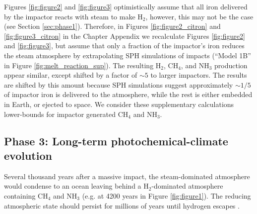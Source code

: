 Figures \ref{fig:figure2} and \ref{fig:figure3} optimistically assume that all iron delivered by the impactor reacts with steam to make H$_2$, however, this may not be the case (see Section \ref{sec:phase1}). Therefore, in Figures \ref{fig:figure2_citron} and \ref{fig:figure3_citron} in the Chapter Appendix we recalculate Figures \ref{fig:figure2} and \ref{fig:figure3}, but assume that only a fraction of the impactor's iron reduces the steam atmosphere by extrapolating SPH simulations of impacts (``Model 1B'' in Figure \ref{fig:melt_reaction_sup}). The resulting H$_2$, CH$_4$, and NH$_3$ production appear similar, except shifted by a factor of $\sim 5$ to larger impactors. The results are shifted by this amount because SPH simulations suggest approximately $\sim 1/5$ of impactor iron is delivered to the atmosphere, while the rest is either embedded in Earth, or ejected to space. We consider these supplementary calculations lower-bounds for impactor generated CH$_4$ and NH$_3$.

\subsection{Phase 3: Long-term photochemical-climate evolution} \label{sec:phase3}

Several thousand years after a massive impact, the steam-dominated atmosphere would condense to an ocean leaving behind a H$_2$-dominated atmosphere containing CH$_4$ and NH$_3$ (e.g. at 4200 years in Figure \ref{fig:figure1}). The reducing atmospheric state should persist for millions of years until hydrogen escapes \citep{Zahnle_2020}.

